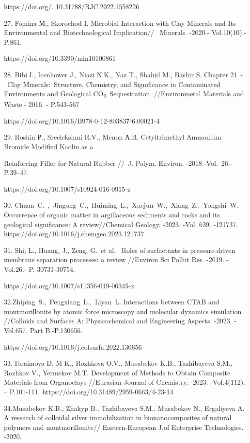 \begin{noparindent}
https://doi.org/. 10.31788/RJC.2022.1558226

27. Fomina М., Skorochod I. Microbial Interaction with Clay Minerals and
Its Environmental and Biotechnological Implication//~ Minerals. -2020.-
Vol.10(10).- P.861.

https://doi.org/10.3390/min10100861

28. Bibi I., Icenhower J., Niazi N.K., Naz T., Shahid M., Bashir S.
Chapter 21~-~Clay Minerals:~Structure, Chemistry, and Significance in
Contaminated Environments and Geological
CO\textsubscript{2}~Sequestration. //Environmetal Materials and Waste.-
2016. - P.543-567

https://doi.org/10.1016/B978-0-12-803837-6.00021-4

29. Roshin Р., Sreelekshmi R.V., Menon А.R. Cetyltrimethyl Ammonium
Bromide Modified Kaolin as a

Reinforcing Filler for Natural Rubber //~J.
Polym. Environ. -2018.-Vol.~26.- P.39--47.

https://doi.org/10.1007/s10924-016-0915-z

30. Chuan~C.~,~Jingong~C.,~Huiming~L.,~Xuejun~W.,~Xiang~Z.,~Yongshi~W.
Occurrence of organic matter in argillaceous sediments and rocks and its
geological significance: A review//Chemical Geology. -2023. -Vol. 639.
-121737. https://doi.org/10.1016/j.chemgeo.2023.121737

31. Shi, L., Huang, J., Zeng, G.~et al.~ Roles of surfactants in
pressure-driven membrane separation processes: a review //Environ Sci
Pollut Res. -2019. -Vol.26.- P. 30731-30754.

https://doi.org/10.1007/s11356-019-06345-x

32.Zhiping~S.,~Pengxiang~L.,~Liyan~L. Interactions between CTAB and
montmorillonite by atomic force microscopy and molecular dynamics
simulation //Colloids and Surfaces A: Physicochemical and Engineering
Aspects. -2023. -Vol.657. Part B.-P.130656.

https://doi.org/10.1016/j.colsurfa.2022.130656

33. Ibraimova D. M-K., Rozhkova O.V., Musabekov K.B., Tazhibayeva S.M.,
Rozhkov V., Yermekov M.T. Development of Methods to Obtain Composite
Materials from Organoclays //Eurasian Journal of Chemistry. -2023.
-Vol.4(112). -- P.101-111. https://doi.org/10.31489/2959-0663/4-23-14

34.Musabekov K.B., Zhakyp B., Tazhibayeva S.M., Musabekov N., Ergaliyeva
A. A research of colloidal silver immobilization in bionanocomposites of
natural polymers and montmorillonite// Eastern-European J.of Enterprise
Technologies. -2020.


\end{noparindent}
